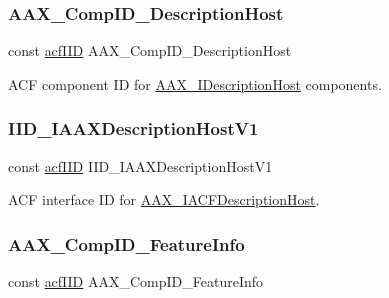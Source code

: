 \mbox{\label{a00683_a9a13fa824d749a47cab7e7d9f7482600}} 
\subsubsection{\texorpdfstring{AAX\_CompID\_DescriptionHost}{AAX\_CompID\_DescriptionHost}}
{\footnotesize\ttfamily const \mbox{\hyperlink{a00269_a59df0b41744eee7a066787aaedf97f67}{acf\+I\+ID}} A\+A\+X\+\_\+\+Comp\+I\+D\+\_\+\+Description\+Host}



A\+CF component ID for \mbox{\hyperlink{a01793}{A\+A\+X\+\_\+\+I\+Description\+Host}} components. 

\mbox{\label{a00683_a1ffea676bbcfc48ac90e39ea2c2a735b}} 
\subsubsection{\texorpdfstring{IID\_IAAXDescriptionHostV1}{IID\_IAAXDescriptionHostV1}}
{\footnotesize\ttfamily const \mbox{\hyperlink{a00269_a59df0b41744eee7a066787aaedf97f67}{acf\+I\+ID}} I\+I\+D\+\_\+\+I\+A\+A\+X\+Description\+Host\+V1}



A\+CF interface ID for \mbox{\hyperlink{a01649}{A\+A\+X\+\_\+\+I\+A\+C\+F\+Description\+Host}}. 

\mbox{\label{a00683_aae0f0aac0bf016668407259eb98a0c81}} 
\subsubsection{\texorpdfstring{AAX\_CompID\_FeatureInfo}{AAX\_CompID\_FeatureInfo}}
{\footnotesize\ttfamily const \mbox{\hyperlink{a00269_a59df0b41744eee7a066787aaedf97f67}{acf\+I\+ID}} A\+A\+X\+\_\+\+Comp\+I\+D\+\_\+\+Feature\+Info}




